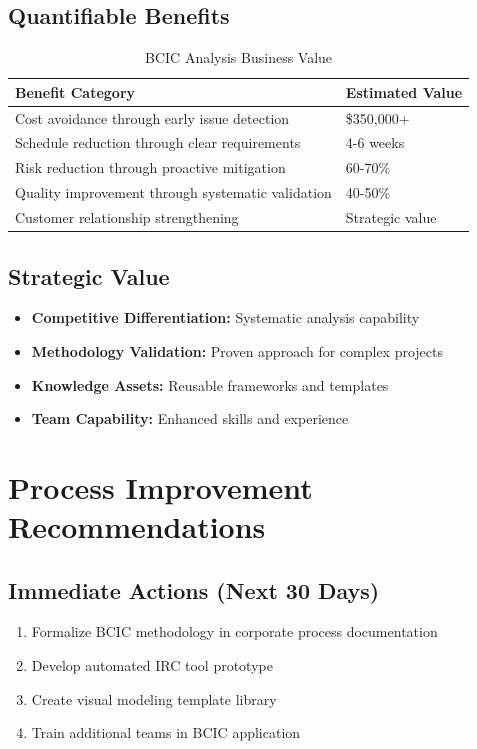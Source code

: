 \documentclass[12pt,a4paper]{article}
\begin{document}
\subsection{Quantifiable Benefits}
\begin{table}[H]
\centering
\begin{tabular}{|p{}|p{}|}
\hline
\textbf{Benefit Category} & \textbf{Estimated Value} \\
\hline
Cost avoidance through early issue detection & \$350,000+ \\
\hline
Schedule reduction through clear requirements & 4-6 weeks \\
\hline
Risk reduction through proactive mitigation & 60-70\% \\
\hline
Quality improvement through systematic validation & 40-50\% \\
\hline
Customer relationship strengthening & Strategic value \\
\hline
\end{tabular}
\caption{BCIC Analysis Business Value}
\end{table}

\subsection{Strategic Value}
\begin{itemize}
    \item \textbf{Competitive Differentiation:} Systematic analysis capability
    \item \textbf{Methodology Validation:} Proven approach for complex projects
    \item \textbf{Knowledge Assets:} Reusable frameworks and templates
    \item \textbf{Team Capability:} Enhanced skills and experience
\end{itemize}

\section{Process Improvement Recommendations}

\subsection{Immediate Actions (Next 30 Days)}
\begin{enumerate}
    \item Formalize BCIC methodology in corporate process documentation
    \item Develop automated IRC tool prototype
    \item Create visual modeling template library
    \item Train additional teams in BCIC application
\end{enumerate}
\end{document}
